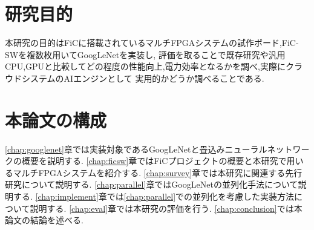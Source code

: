 {  \section{研究目的}
  \label{sec:purpose}
  本研究の目的はFiCに搭載されているマルチFPGAシステムの試作ボード,FiC-SWを複数枚用いてGoogLeNetを実装し,
  評価を取ることで既存研究や汎用CPU,GPUと比較してどの程度の性能向上,電力効率となるかを調べ,実際にクラウドシステムのAIエンジンとして
  実用的かどうか調べることである.

  \section{本論文の構成}
  \label{sec:composition}
  \ref{chap:googlenet}章では実装対象であるGoogLeNetと畳込みニューラルネットワークの概要を説明する.
  \ref{chap:ficsw}章ではFiCプロジェクトの概要と本研究で用いるマルチFPGAシステムを紹介する.
  \ref{chap:survey}章では本研究に関連する先行研究について説明する.
  \ref{chap:parallel}章ではGoogLeNetの並列化手法について説明する.
  \ref{chap:implement}章では\ref{chap:parallel}での並列化を考慮した実装方法について説明する. 
  \ref{chap:eval}章では本研究の評価を行う. 
  \ref{chap:conclusion}では本論文の結論を述べる.
}
